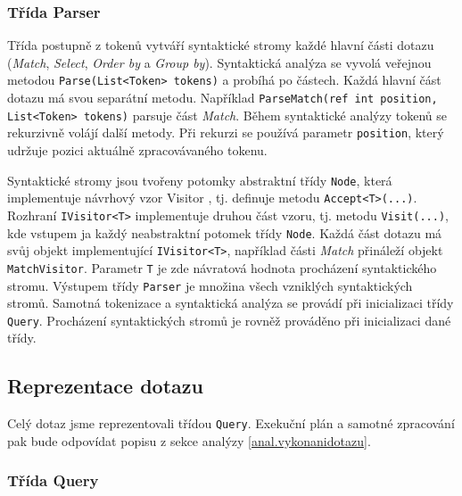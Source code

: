 \subsubsection{Třída Parser}

Třída postupně z tokenů vytváří syntaktické stromy každé hlavní části dotazu (\textit{Match}, \textit{Select}, \textit{Order by} a \textit{Group by}).
Syntaktická analýza se vyvolá veřejnou metodou \texttt{Parse(List<Token> tokens)} a probíhá po částech.
Každá hlavní část dotazu má svou separátní metodu.
Například \texttt{ParseMatch(ref int position, List<Token> tokens)} parsuje část \textit{Match}. 
Během syntaktické analýzy tokenů se rekurzivně volájí další metody.
Při rekurzi se používá parametr \texttt{position}, který udržuje pozici aktuálně zpracovávaného tokenu.

Syntaktické stromy jsou tvořeny potomky abstraktní třídy \texttt{Node}, která implementuje návrhový vzor Visitor \citep[str. 331]{patterns}, tj. definuje metodu \texttt{Accept<T>(...)}.
Rozhraní \texttt{IVisitor<T>} implementuje druhou část vzoru, tj. metodu \texttt{Visit(...)}, kde vstupem ja každý neabstraktní potomek třídy \texttt{Node}.
Každá část dotazu má svůj objekt implementující \texttt{IVisitor<T>}, například části \textit{Match} přináleží objekt \texttt{MatchVisitor}.
Parametr \texttt{T} je zde návratová hodnota procházení syntaktického stromu.
Výstupem třídy \texttt{Parser} je množina všech vzniklých syntaktických stromů.
Samotná tokenizace a syntaktická analýza se provádí při inicializaci třídy \texttt{Query}.
Procházení syntaktických stromů je rovněž prováděno při inicializaci dané třídy.

\subsection{Reprezentace dotazu}
Celý dotaz jsme reprezentovali třídou \texttt{Query}.
Exekuční plán a samotné zpracování pak bude odpovídat popisu z sekce analýzy \ref{anal.vykonanidotazu}.

\subsubsection{Třída Query}

